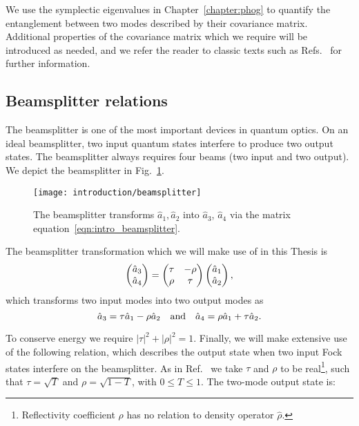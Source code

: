 \noindent We use the symplectic eigenvalues in Chapter~\ref{chapter:phog} to quantify the entanglement between two modes described by their covariance matrix. Additional properties of the covariance matrix which we require will be introduced as needed, and we refer the reader to classic texts such as Refs.~\cite{Weedbrook2012, Serafini2017} for further information.


\FloatBarrier
\subsection{Beamsplitter relations}
The beamsplitter is one of the most important devices in quantum optics. On an ideal beamsplitter, two input quantum states interfere to produce two output states. The beamsplitter always requires four beams (two input and two output). We depict the beamsplitter in Fig.~\ref{fig:intro_beamsplitter}. %


\begin{figure}[htp]
\centering
\captionsetup{width=0.8\linewidth}
\texttt{[image: introduction/beamsplitter]}
\caption{\label{fig:intro_beamsplitter} The beamsplitter transforms $\hat{a}_1, \hat{a}_2$ into $\hat{a}_3$, $\hat{a}_4$ via the matrix equation~\ref{eqn:intro_beamsplitter}.}
\end{figure}


The beamsplitter transformation which we will make use of in this Thesis is
\begin{equation}\label{eqn:intro_beamsplitter}
\pmqty{\hat{a}_3 \\ \hat{a}_4} = \pmqty{\tau & -\rho \\  \rho & \tau} \pmqty{\hat{a}_1 \\ \hat{a}_2},
\end{equation}
which transforms two input modes into two output modes as
\begin{equation}
\hat{a}_3 = \tau \hat{a}_1 - \rho \hat{a}_2 \qq{and} \hat{a}_4 = \rho \hat{a}_1 + \tau \hat{a}_2.
\end{equation}

\noindent To conserve energy we require $\left|\tau\right|^2 + \left|\rho\right|^2 = 1$. %
Finally, we will make extensive use of the following relation, which describes the output state when two input Fock states interfere on the beamsplitter. As in Ref.~\cite{Leonhardt2010} we take $\tau$ and $\rho$ to be real\footnote{Reflectivity coefficient $\rho$ has no relation to density operator $\hat{\rho}$.}, such that $\tau = \sqrt{T}$ and $\rho = \sqrt{1-T}$, with $0 \le T \le 1$. The two-mode output state is:

